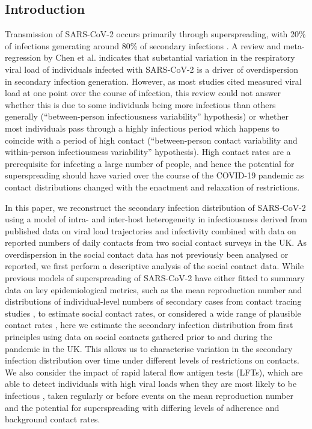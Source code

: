 \documentclass[
  10pt,
  letterpaper,
]{article}
\begin{document}
\subsection{Introduction}\label{introduction}

Transmission of SARS-CoV-2 occurs primarily through superspreading, with
20\% of infections generating around 80\% of secondary infections
\citep{endo2020}. A review and meta-regression by Chen et al.
\citep{chen2021} indicates that substantial variation in the respiratory
viral load of individuals infected with SARS-CoV-2 is a driver of
overdispersion in secondary infection generation. However, as most
studies cited measured viral load at one point over the course of
infection, this review could not answer whether this is due to some
individuals being more infectious than others generally
(``between-person infectiousness variability'' hypothesis) or whether
most individuals pass through a highly infectious period which happens
to coincide with a period of high contact (``between-person contact
variability and within-person infectiousness variability'' hypothesis).
High contact rates are a prerequisite for infecting a large number of
people, and hence the potential for superspreading should have varied
over the course of the COVID-19 pandemic as contact distributions
changed with the enactment and relaxation of restrictions.

In this paper, we reconstruct the secondary infection distribution of
SARS-CoV-2 using a model of intra- and inter-host heterogeneity in
infectiousness derived from published data on viral load trajectories
and infectivity combined with data on reported numbers of daily contacts
from two social contact surveys in the UK. As overdispersion in the
social contact data has not previously been analysed or reported, we
first perform a descriptive analysis of the social contact data. While
previous models of superspreading of SARS-CoV-2 have either fitted to
summary data on key epidemiological metrics, such as the mean
reproduction number and distributions of individual-level numbers of
secondary cases from contact tracing studies \citep{goyal2021}, to
estimate social contact rates, or considered a wide range of plausible
contact rates \citep{susswein2020}, here we estimate the secondary
infection distribution from first principles using data on social
contacts gathered prior to and during the pandemic in the UK. This
allows us to characterise variation in the secondary infection
distribution over time under different levels of restrictions on
contacts. We also consider the impact of rapid lateral flow antigen
tests (LFTs), which are able to detect individuals with high viral loads
when they are most likely to be infectious
\citep{killingley2022, ke2022}, taken regularly or before events on the
mean reproduction number and the potential for superspreading with
differing levels of adherence and background contact rates.
\end{document}
